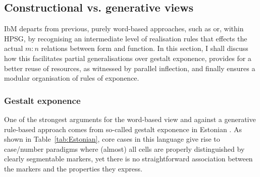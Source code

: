 \documentclass[output=paper
	        ,collection
	        ,collectionchapter
 	        ,biblatex
                ,babelshorthands
                ,newtxmath
                ,draftmode
                ,colorlinks, citecolor=brown
]{langscibook}
\begin{document}
\begin{exe}
\begin{xlist}
\begin{exe}
\begin{xlist}
\subsection{Constructional vs. generative views}
\label{sec:ConstrGen}

IbM departs from previous, purely word-based approaches, such as
\citet{Blevins14} or, within HPSG, \citet[Section~5.2.2]{Koenig99} by recognising an
intermediate level of realisation rules that effects the actual $m:n$
relations between form and function. In this section, I shall discuss
how this facilitates partial generalisations over gestalt exponence,
provides for a better reuse of resources, as witnessed by parallel
inflection, and finally ensures a modular organisation of rules of
exponence.

\subsubsection{Gestalt exponence}

One of the strongest arguments for the word-based view and against a
generative rule-based approach comes from so-called gestalt exponence
in Estonian \citep{Blevins05}. As shown in Table~\ref{tab:Estonian},
core cases in this language give rise to case/number paradigms where
(almost) all cells are properly distinguished by clearly segmentable
markers, yet there is no straightforward association between the
markers and the properties they express.   



\end{xlist}
\end{exe}
\end{xlist}
\end{exe}
\end{document}
